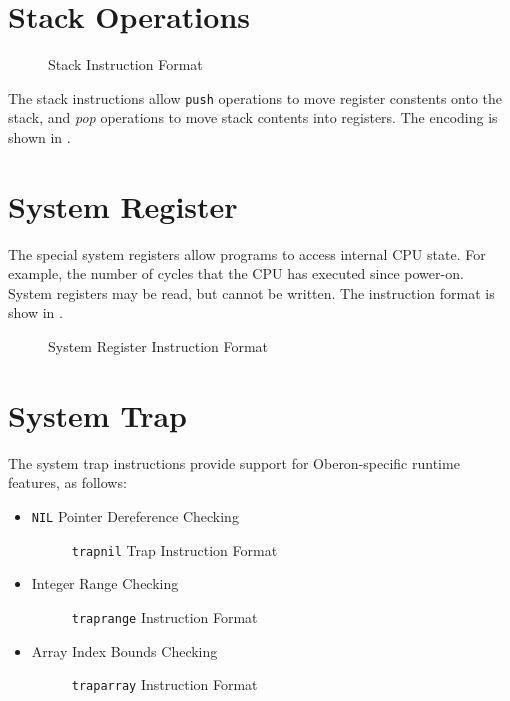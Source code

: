 \section{Stack Operations}

\begin{figure}[h!]
  \centering
    \usebox{\stktypebox}
    \caption{Stack Instruction Format}
    \label{fig:stack-format}
\end{figure}

The stack instructions allow \texttt{push} operations to move register
constents onto the stack, and \emph{pop} operations to move stack
contents into registers.  The encoding is shown in
.


\section{System Register}

The special system registers allow programs to access internal
\ac{CPU} state.  For example, the number of cycles that the \ac{CPU}
has executed since power-on.  System registers may be read, but cannot
be written.  The instruction format is show in .


\begin{figure}[H]
  \centering
  \usebox{\sregtypebox}
    \caption{System Register Instruction Format}
    \label{fig:sysreg-format}
\end{figure}

\section{System Trap}

The system trap instructions provide support for Oberon-specific
runtime features, as follows:

\begin{itemize}
\item \texttt{NIL} Pointer Dereference Checking

  \begin{figure}[H]
    \centering
    \usebox{\traptypebox}
    \caption{\texttt{trapnil} Trap Instruction Format}
  \end{figure}

\item Integer Range Checking
  \begin{figure}[H]
    \centering
    \usebox{\traptypebox}
    \caption{\texttt{traprange} Instruction Format}
  \end{figure}


\item Array Index Bounds Checking
  \begin{figure}[H]
    \centering
    \usebox{\traptypebox}
    \caption{\texttt{traparray} Instruction Format}
  \end{figure}
\end{itemize}
